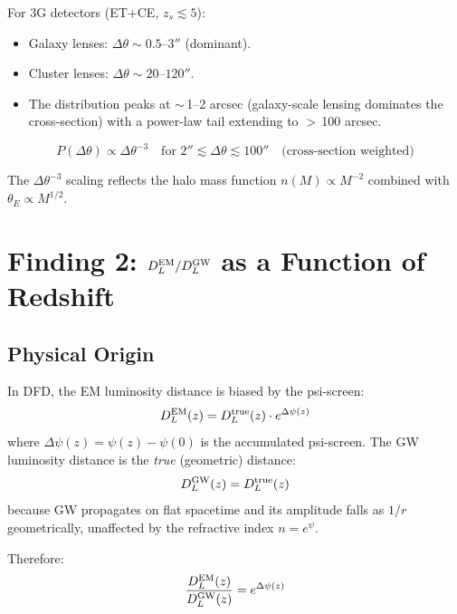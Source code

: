 \documentclass[11pt,a4paper]{article}
\newcommand{\Dpsi}{\Delta\psi}
\begin{document}
For 3G detectors (ET+CE, $z_s \lesssim 5$):
\begin{itemize}
\item Galaxy lenses: $\Delta\theta \sim 0.5$--$3''$ (dominant).
\item Cluster lenses: $\Delta\theta \sim 20$--$120''$.
\item The distribution peaks at $\sim$\,1--2 arcsec (galaxy-scale
  lensing dominates the cross-section) with a power-law tail
  extending to $>$\,100 arcsec.
\end{itemize}

\begin{equation}
\boxed{
P(\Delta\theta) \propto \Delta\theta^{-3} \quad
\text{for } 2'' \lesssim \Delta\theta \lesssim 100''
\quad \text{(cross-section weighted)}
}
\end{equation}

The $\Delta\theta^{-3}$ scaling reflects the halo mass function
$n(M) \propto M^{-2}$ combined with $\theta_E \propto M^{1/2}$.


\section{Finding 2: $D_L^{\rm EM}/D_L^{\rm GW}$ as a Function of Redshift}
\label{sec:DL-ratio}

\subsection{Physical Origin}

In DFD, the EM luminosity distance is biased by the psi-screen:
\begin{equation}
D_L^{\rm EM}(z) = D_L^{\rm true}(z) \cdot e^{\Dpsi(z)}
\end{equation}
where $\Dpsi(z) = \psi(z) - \psi(0)$ is the accumulated psi-screen.
The GW luminosity distance is the \emph{true} (geometric) distance:
\begin{equation}
D_L^{\rm GW}(z) = D_L^{\rm true}(z)
\end{equation}
because GW propagates on flat spacetime and its amplitude falls as
$1/r$ geometrically, unaffected by the refractive index $n = e^\psi$.

Therefore:
\begin{equation}
\frac{D_L^{\rm EM}(z)}{D_L^{\rm GW}(z)} = e^{\Dpsi(z)}
\label{eq:DL-ratio}
\end{equation}
\end{document}
